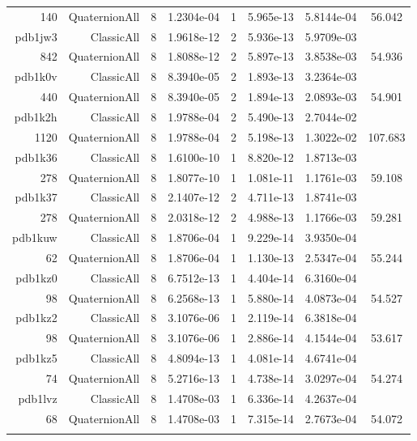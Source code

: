 \begin{xltabular}{\textwidth}{r|rcS[table-format=1.4e+2]cS[table-format=1.3e+2]S[table-format=1.4e+2]S[table-format=-1.3]}
140 & QuaternionAll & 8 & 1.2304e-04 & 1 & 5.965e-13 & 5.8144e-04 & 56.042\\  \addlinespace
pdb1jw3 & ClassicAll & 8 & 1.9618e-12 & 2 & 5.936e-13 & 5.9709e-03 & \\
842 & QuaternionAll & 8 & 1.8088e-12 & 2 & 5.897e-13 & 3.8538e-03 & 54.936\\  \addlinespace
pdb1k0v & ClassicAll & 8 & 8.3940e-05 & 2 & 1.893e-13 & 3.2364e-03 & \\
440 & QuaternionAll & 8 & 8.3940e-05 & 2 & 1.894e-13 & 2.0893e-03 & 54.901\\  \addlinespace
pdb1k2h & ClassicAll & 8 & 1.9788e-04 & 2 & 5.490e-13 & 2.7044e-02 & \\
1120 & QuaternionAll & 8 & 1.9788e-04 & 2 & 5.198e-13 & 1.3022e-02 & 107.683\\  \addlinespace
pdb1k36 & ClassicAll & 8 & 1.6100e-10 & 1 & 8.820e-12 & 1.8713e-03 & \\
278 & QuaternionAll & 8 & 1.8077e-10 & 1 & 1.081e-11 & 1.1761e-03 & 59.108\\  \addlinespace
pdb1k37 & ClassicAll & 8 & 2.1407e-12 & 2 & 4.711e-13 & 1.8741e-03 & \\
278 & QuaternionAll & 8 & 2.0318e-12 & 2 & 4.988e-13 & 1.1766e-03 & 59.281\\  \addlinespace
pdb1kuw & ClassicAll & 8 & 1.8706e-04 & 1 & 9.229e-14 & 3.9350e-04 & \\
62 & QuaternionAll & 8 & 1.8706e-04 & 1 & 1.130e-13 & 2.5347e-04 & 55.244\\  \addlinespace
pdb1kz0 & ClassicAll & 8 & 6.7512e-13 & 1 & 4.404e-14 & 6.3160e-04 & \\
98 & QuaternionAll & 8 & 6.2568e-13 & 1 & 5.880e-14 & 4.0873e-04 & 54.527\\  \addlinespace
pdb1kz2 & ClassicAll & 8 & 3.1076e-06 & 1 & 2.119e-14 & 6.3818e-04 & \\
98 & QuaternionAll & 8 & 3.1076e-06 & 1 & 2.886e-14 & 4.1544e-04 & 53.617\\  \addlinespace
pdb1kz5 & ClassicAll & 8 & 4.8094e-13 & 1 & 4.081e-14 & 4.6741e-04 & \\
74 & QuaternionAll & 8 & 5.2716e-13 & 1 & 4.738e-14 & 3.0297e-04 & 54.274\\  \addlinespace
pdb1lvz & ClassicAll & 8 & 1.4708e-03 & 1 & 6.336e-14 & 4.2637e-04 & \\
68 & QuaternionAll & 8 & 1.4708e-03 & 1 & 7.315e-14 & 2.7673e-04 & 54.072\\  \addlinespace

\end{xltabular}
